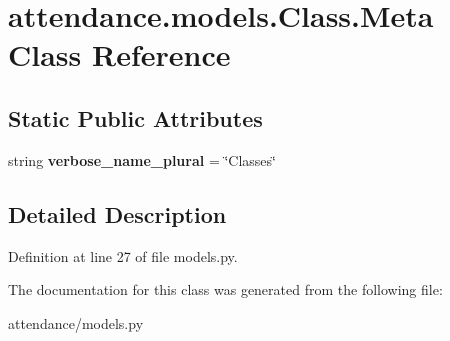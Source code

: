 \hypertarget{classattendance_1_1models_1_1_class_1_1_meta}{}\section{attendance.\+models.\+Class.\+Meta Class Reference}
\label{classattendance_1_1models_1_1_class_1_1_meta}
\subsection*{Static Public Attributes}
\begin{DoxyCompactItemize}
\item 
\hypertarget{classattendance_1_1models_1_1_class_1_1_meta_a6ee6202768d75c1562e2f24929617eba}{}\label{classattendance_1_1models_1_1_class_1_1_meta_a6ee6202768d75c1562e2f24929617eba} 
string {\bfseries verbose\+\_\+name\+\_\+plural} = \char`\"{}Classes\char`\"{}
\end{DoxyCompactItemize}


\subsection{Detailed Description}


Definition at line 27 of file models.\+py.



The documentation for this class was generated from the following file\+:\begin{DoxyCompactItemize}
\item 
attendance/models.\+py\end{DoxyCompactItemize}
